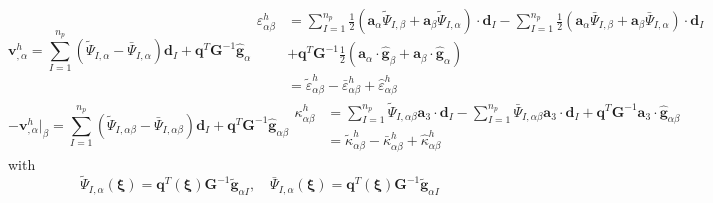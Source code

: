 \begin{subequations}
\begin{equation}
\boldsymbol v^h_{,\alpha} = \sum_{I=1}^{n_p}(
\tilde \Psi_{I,\alpha} - \bar \Psi_{I,\alpha}) \boldsymbol d_I +
\boldsymbol q^T \boldsymbol G^{-1}\hat{\boldsymbol g}_{\alpha}
\end{equation}
\begin{equation}\label{epsilonh}
\begin{split}
\varepsilon^h_{\alpha\beta} &= 
\sum_{I=1}^{n_p} \frac{1}{2}(\boldsymbol a_\alpha \tilde \Psi_{I,\beta} + \boldsymbol a_\beta \tilde \Psi_{I,\alpha}) \cdot \boldsymbol d_I 
- \sum_{I=1}^{n_p} \frac{1}{2}(\boldsymbol a_\alpha \bar \Psi_{I,\beta} + \boldsymbol a_\beta \bar \Psi_{I,\alpha}) \cdot \boldsymbol d_I \\
&+ \boldsymbol q^T \boldsymbol G^{-1} \frac{1}{2}(\boldsymbol a_\alpha \cdot \hat{\boldsymbol g}_{\beta} + \boldsymbol a_\beta \cdot \hat{\boldsymbol g}_{\alpha}) \\
&= \tilde \varepsilon^h_{\alpha\beta} - \bar \varepsilon^h_{\alpha\beta} + \hat \varepsilon^h_{\alpha\beta}
\end{split}
\end{equation}
\end{subequations}
\begin{subequations}
\begin{equation}
-\boldsymbol v^h_{,\alpha}\vert_\beta = \sum_{I=1}^{n_p} (
\tilde \Psi_{I,\alpha\beta} -
\bar \Psi_{I,\alpha\beta} ) \boldsymbol d_I +
\boldsymbol q^T \boldsymbol G^{-1}\hat{\boldsymbol g}_{\alpha\beta}
\end{equation}
\begin{equation}\label{kappah}
\begin{split}
\kappa^h_{\alpha\beta} &= \sum_{I=1}^{n_p} \tilde \Psi_{I,\alpha\beta} \boldsymbol a_3 \cdot \boldsymbol d_I
- \sum_{I=1}^{n_p} \bar \Psi_{I,\alpha\beta} \boldsymbol a_3 \cdot \boldsymbol d_I +
\boldsymbol q^T \boldsymbol G^{-1}\boldsymbol a_3 \cdot \hat{\boldsymbol g}_{\alpha\beta} \\
&= \tilde \kappa^h_{\alpha\beta} - \bar \kappa^h_{\alpha\beta} + \hat \kappa^h_{\alpha\beta}
\end{split}
\end{equation}
\end{subequations}
with
\begin{equation}
\tilde{\Psi}_{I,\alpha}(\boldsymbol \xi) = \boldsymbol q^T(\boldsymbol \xi) \boldsymbol G^{-1} \tilde{\boldsymbol g}_{\alpha I}, \quad
\bar{\Psi}_{I,\alpha}(\boldsymbol \xi) = \boldsymbol q^T(\boldsymbol \xi) \boldsymbol G^{-1} \tilde{\boldsymbol g}_{\alpha I}
\end{equation}
